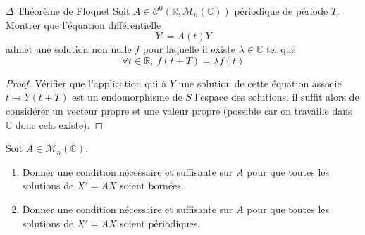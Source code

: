 \documentclass[french,a4paper]{article}
\newcommand{\R}{\mathbb{R}}
\newcommand{\C}{\mathbb{C}}
\theoremstyle{plain}
\theoremstyle{definition}
\theoremstyle{remark}
\begin{document}
\begin{ex}[Moulin.35]{$\Delta$ Théorème de Floquet}
	Soit $A\in\mathcal{C}^0(\R,\mathcal{M}_n(\C))$ périodique de période $T$. Montrer que l'équation différentielle $$Y'=A(t)Y$$ admet une solution non nulle $f$ pour laquelle il existe $\lambda\in\C$ tel que $$\forall t\in\R,\ f(t+T)=\lambda f(t)$$
\end{ex}
\begin{proof}
	Vérifier que l'application qui à $Y$ une solution de cette équation associe $t\mapsto Y(t+T)$ est un endomorphisme de $S$ l'espace des solutions. il suffit alors de considérer un vecteur propre et une valeur propre (possible car on travaille dans $\C$ donc cela existe).
\end{proof}

\begin{ex}[Moulin.36]{}
	Soit $A\in\mathcal{M}_n(\C)$.
	\begin{enumerate}
		\item Donner une condition nécessaire et suffisante sur $A$ pour que toutes les solutions de $X'=AX$ soient bornées.
		\item Donner une condition nécessaire et suffisante sur $A$ pour que toutes les solutions de $X'=AX$ soient périodiques.
	\end{enumerate}
\end{ex}
\end{document}
